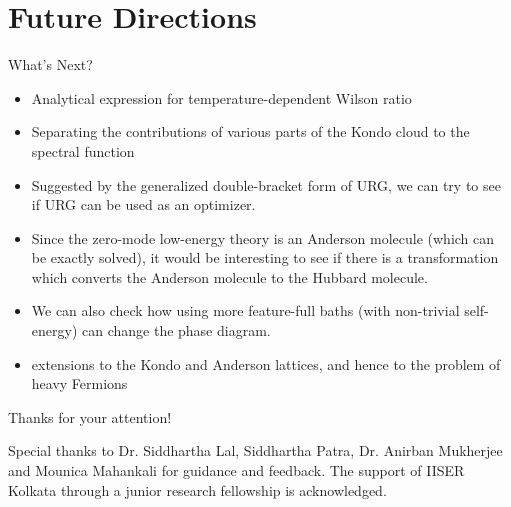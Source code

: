 \documentclass[aspectratio=169]{beamer}
\newcommand{\cen}[1]{\begin{center}{#1}\end{center}}
\begin{document}
\section{Future Directions}
\begin{frame}[noframenumbering]{What's Next?}
\begin{itemize} 
\item Analytical expression for temperature-dependent Wilson ratio 
	\vspace{5pt}
\item Separating the contributions of various parts of the Kondo cloud to the spectral function
	\vspace{5pt}
\item Suggested by the generalized double-bracket form of URG, we can try to see if URG can be used as an optimizer.
	\vspace{5pt}
\item Since the zero-mode low-energy theory is an Anderson molecule (which can be exactly solved), it would be interesting to see if there is a transformation which converts the Anderson molecule to the Hubbard molecule.
	\vspace{5pt}
\item We can also check how using more feature-full baths (with non-trivial self-energy) can change the phase diagram.
	\vspace{5pt}
\item extensions to the Kondo and Anderson lattices, and hence to the problem of heavy Fermions
\end{itemize}
\end{frame}
\begin{frame}[noframenumbering]{}
	\cen{\LARGE Thanks for your attention!}

	\vspace*{\fill}
	\cen{\large{Special thanks to Dr. Siddhartha Lal, Siddhartha Patra, Dr. Anirban Mukherjee and Mounica Mahankali for guidance and feedback. The support of IISER Kolkata through a junior research fellowship is acknowledged.}}
\end{frame}
{\small \printbibliography}
\end{document}
